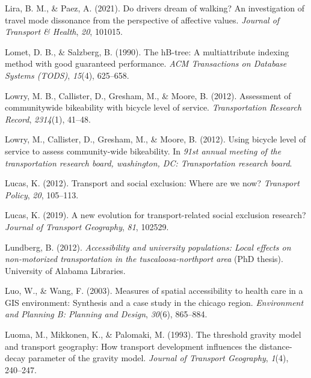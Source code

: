 \documentclass[
11pt, %
oneside, %
english, %
singlespacing, %
]{macthesis} %
\newlength{\cslhangindent}
\newenvironment{CSLReferences}[2] %
 {%
  \setlength{\parindent}{0pt}
  \ifodd #1 \everypar{\setlength{\hangindent}{\cslhangindent}}\ignorespaces\fi
  \ifnum #2 > 0
  \setlength{\parskip}{#2\baselineskip}
  \fi
 }%
 {}
\begin{document}
\begin{CSLReferences}{1}{0}
\leavevmode{}%
Lira, B. M., \& Paez, A. (2021). Do drivers dream of walking? An investigation of travel mode dissonance from the perspective of affective values. \emph{Journal of Transport \& Health}, \emph{20}, 101015.

\leavevmode{}%
Lomet, D. B., \& Salzberg, B. (1990). The hB-tree: A multiattribute indexing method with good guaranteed performance. \emph{ACM Transactions on Database Systems (TODS)}, \emph{15}(4), 625--658.

\leavevmode{}%
Lowry, M. B., Callister, D., Gresham, M., \& Moore, B. (2012). Assessment of communitywide bikeability with bicycle level of service. \emph{Transportation Research Record}, \emph{2314}(1), 41--48.

\leavevmode{}%
Lowry, M., Callister, D., Gresham, M., \& Moore, B. (2012). Using bicycle level of service to assess community-wide bikeability. In \emph{91st annual meeting of the transportation research board, washington, DC: Transportation research board}.

\leavevmode{}%
Lucas, K. (2012). Transport and social exclusion: Where are we now? \emph{Transport Policy}, \emph{20}, 105--113.

\leavevmode{}%
Lucas, K. (2019). A new evolution for transport-related social exclusion research? \emph{Journal of Transport Geography}, \emph{81}, 102529.

\leavevmode{}%
Lundberg, B. (2012). \emph{Accessibility and university populations: Local effects on non-motorized transportation in the tuscaloosa-northport area} (PhD thesis). University of Alabama Libraries.

\leavevmode{}%
Luo, W., \& Wang, F. (2003). Measures of spatial accessibility to health care in a GIS environment: Synthesis and a case study in the chicago region. \emph{Environment and Planning B: Planning and Design}, \emph{30}(6), 865--884.

\leavevmode{}%
Luoma, M., Mikkonen, K., \& Palomaki, M. (1993). The threshold gravity model and transport geography: How transport development influences the distance-decay parameter of the gravity model. \emph{Journal of Transport Geography}, \emph{1}(4), 240--247.


\end{CSLReferences}
\end{document}
